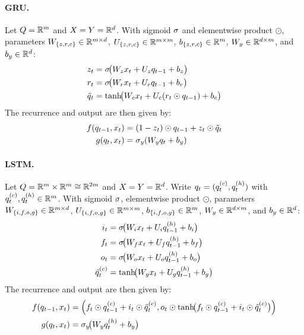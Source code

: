 \documentclass{article}
\begin{document}
\paragraph{GRU.}
Let $Q=\mathbb{R}^m$ and $X=Y=\mathbb{R}^d$. With sigmoid $\sigma$ and elementwise product $\odot$, parameters
$W_{\{z,r,c\}}\in\mathbb{R}^{m\times d}$, $U_{\{z,r,c\}}\in\mathbb{R}^{m\times m}$, $b_{\{z,r,c\}}\in\mathbb{R}^m$, $W_y\in\mathbb{R}^{d\times m}$, and $b_y\in\mathbb{R}^d$:
\begin{align}
z_{t} &= \sigma\!\bigl(W_zx_{t}+U_zq_{t-1}+b_z\bigr)\\
r_{t} &= \sigma\!\bigl(W_rx_{t}+U_rq_{t-1}+b_r\bigr)\\
\tilde{q}_{t} &= \tanh\!\bigl(W_cx_{t}+U_c(r_{t}\odot q_{t-1})+b_c\bigr)\\
\end{align}
The recurrence and output are then given by:
\begin{align}
f(q_{t-1},x_t) &= (1-z_{t})\odot q_{t-1}+z_{t}\odot \tilde{q}_{t}\\
g(q_t,x_t)&=\sigma_y(W_yq_{t}+b_y)
\end{align}

\paragraph{LSTM.}
Let $Q=\mathbb{R}^m\times\mathbb{R}^m\cong\mathbb{R}^{2m}$ and $X=Y=\mathbb{R}^d$. Write $q_t=(q^{(c)}_t,q^{(h)}_t)$ with $q^{(c)}_t,q^{(h)}_t\in\mathbb{R}^m$. 
With sigmoid $\sigma$, elementwise product $\odot$, parameters
$W_{\{i,f,o,g\}}\in\mathbb{R}^{m\times d}$, $U_{\{i,f,o,g\}}\in\mathbb{R}^{m\times m}$, $b_{\{i,f,o,g\}}\in\mathbb{R}^m$,
$W_y\in\mathbb{R}^{d\times m}$, and $b_y\in\mathbb{R}^d$:
\begin{align}
i_{t} &= \sigma\!\bigl(W_ix_{t}+U_iq^{(h)}_{t-1}+b_i\bigr)\\
f_{t} &= \sigma\!\bigl(W_fx_{t}+U_fq^{(h)}_{t-1}+b_f\bigr)\\
o_{t} &= \sigma\!\bigl(W_ox_{t}+U_oq^{(h)}_{t-1}+b_o\bigr)\\
\tilde{q}^{(c)}_{t} &= \tanh\!\bigl(W_gx_{t}+U_gq^{(h)}_{t-1}+b_g\bigr)
\end{align}
The recurrence and output are then given by:
\begin{align}
f(q_{t-1},x_t) 
&= \Bigl(f_{t}\odot q^{(c)}_{t-1}+ i_{t}\odot \tilde{q}^{(c)}_{t}, o_{t}\odot \tanh\!\bigl(f_{t}\odot q^{(c)}_{t-1}+ i_{t}\odot \tilde{q}^{(c)}_{t}\bigr)\Bigr)\\
g(q_t,x_t) &=\sigma_y\!\bigl(W_y q^{(h)}_t+b_y\bigr)
\end{align}
\end{document}
